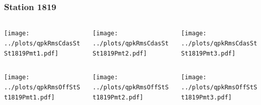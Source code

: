 \documentclass[aspectratio=169]{beamer}
\begin{document}
\begin{frame} 
  \frametitle{Station 1819}
  \begin{center}
    \begin{columns}
      \begin{column}{0.33\textwidth}
        \texttt{[image: ../plots/qpkRmsCdasStSt1819Pmt1.pdf]}
      \end{column}
      \begin{column}{0.33\textwidth}
        \texttt{[image: ../plots/qpkRmsCdasStSt1819Pmt2.pdf]}
      \end{column}
      \begin{column}{0.33\textwidth}
        \texttt{[image: ../plots/qpkRmsCdasStSt1819Pmt3.pdf]}
      \end{column}
    \end{columns}
  \end{center}

  \begin{center}
    \begin{columns}
      \begin{column}{0.33\textwidth}
        \texttt{[image: ../plots/qpkRmsOffStSt1819Pmt1.pdf]}
      \end{column}
      \begin{column}{0.33\textwidth}
        \texttt{[image: ../plots/qpkRmsOffStSt1819Pmt2.pdf]}
      \end{column}
      \begin{column}{0.33\textwidth}
        \texttt{[image: ../plots/qpkRmsOffStSt1819Pmt3.pdf]}
      \end{column}
    \end{columns}
  \end{center}
\end{frame}
\end{document}
